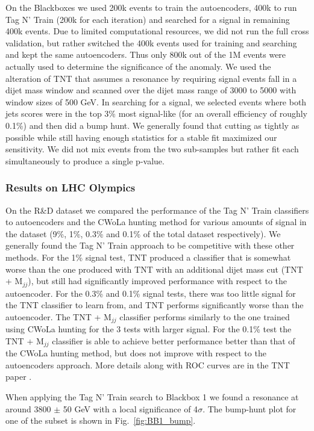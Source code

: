 \documentclass[a4paper,11pt]{article}
\begin{document}
On the Blackboxes we used 200k events to train the autoencoders, 400k to run Tag N' Train (200k for each iteration) and searched for a signal in remaining 400k events. 
Due to limited computational resources, we did not run the full cross validation, but rather switched the 400k events used for training and searching and kept the same autoencoders. 
Thus only 800k out of the 1M events were actually used to determine the significance of the anomaly. 
We used the alteration of TNT that assumes a resonance by requiring signal events fall in a dijet mass window and scanned over the dijet mass range of 3000 to 5000 with window sizes of 500 GeV.
In searching for a signal, we selected events where both jets scores were in the top 3\% most signal-like (for an overall efficiency of roughly 0.1\%) and then did a bump hunt.
We generally found that cutting as tightly as possible while still having enough statistics for a stable fit maximized our sensitivity.
We did not mix events from the two sub-samples but rather fit each simultaneously to produce a single p-value. 


\subsubsection{Results on LHC Olympics}
\label{sec:results}

\noindent On the R\&D dataset we compared the performance of the Tag N' Train classifiers to autoencoders and the CWoLa hunting \cite{Collins:2018epr,Collins:2019jip} method for various amounts of signal in the dataset 
(9\%, 1\%, 0.3\% and 0.1\% of the total dataset respectively).  
We generally found the Tag N' Train approach to be competitive with these other methods.
For the 1\% signal test, TNT produced a classifier that is somewhat worse than the one produced with TNT with an additional dijet mass cut (TNT + M$_{jj}$), 
but still had significantly improved performance with respect to the autoencoder.
For the 0.3\% and 0.1\% signal tests, there was too little signal for the TNT classifier to learn from, and TNT performs significantly worse than the autoencoder. 
The TNT + M$_{jj}$ classifier performs similarly to the one trained using CWoLa hunting for the 3 tests with larger signal.
For the 0.1\% test the TNT + M$_{jj}$ classifier is able to achieve better performance better than that of the CWoLa hunting method, but does not improve with respect to the autoencoders approach.
More details along with ROC curves are in the TNT paper \cite{Amram:2020ykb}.

When applying the Tag N' Train search to Blackbox 1 we found a resonance at around 3800 $\pm$ 50 GeV with a local significance of 4$\sigma$. 
The bump-hunt plot for one of the subset is shown in Fig.~\ref{fig:BB1_bump}.
\end{document}
